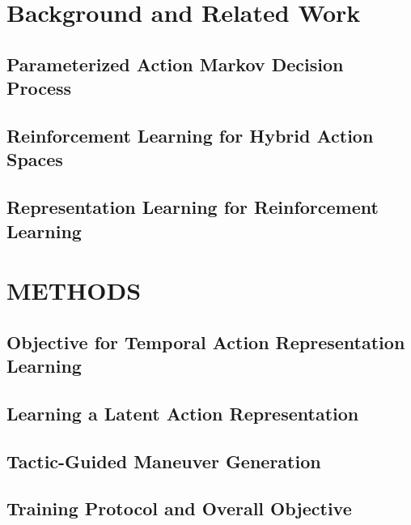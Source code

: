 \documentclass[letterpaper, 10 pt, conference]{ieeeconf}
\begin{document}
\section{Background and Related Work}
\subsection{Parameterized Action Markov Decision Process}

\subsection{Reinforcement Learning for Hybrid Action Spaces}

\subsection{Representation Learning for Reinforcement Learning}


\section{METHODS}

\subsection{Objective for Temporal Action Representation Learning}

\subsection{Learning a Latent Action Representation}

\subsection{Tactic-Guided Maneuver Generation}

\subsection{Training Protocol and Overall Objective}

\end{document}
